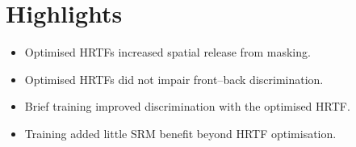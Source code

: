 \documentclass[11pt]{article}
\begin{document}
\section*{Highlights}

\begin{itemize}
  \item Optimised HRTFs increased spatial release from masking.
  \item Optimised HRTFs did not impair front--back discrimination.
  \item Brief training improved discrimination with the optimised HRTF.
  \item Training added little SRM benefit beyond HRTF optimisation.
\end{itemize}
\end{document}
